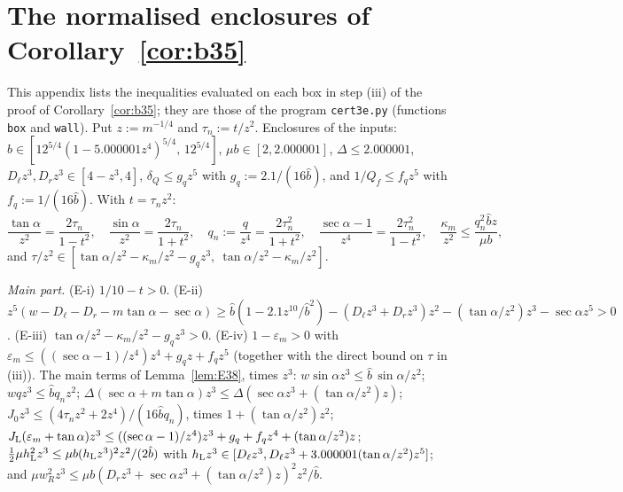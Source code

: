 \documentclass[11pt]{amsart}
\newcommand{\sa}{\sin\alpha}
\newcommand{\ta}{\tan\alpha}
\newcommand{\se}{\sec\alpha}
\theoremstyle{definition}
\theoremstyle{remark}
\numberwithin{equation}{section}
\begin{document}
\section{The normalised enclosures of Corollary~\ref{cor:b35}}\label{app:enc}
This appendix lists the inequalities evaluated on each box in step (iii) of the proof of Corollary~\ref{cor:b35}; they
are those of the program \texttt{cert3e.py} (functions \texttt{box} and \texttt{wall}). Put $z:=m^{-1/4}$ and
$\tau_n:=t/z^2$. Enclosures of the inputs: $\hat b\in[12^{5/4}(1-5.000001z^4)^{5/4},\,12^{5/4}]$, $\mu b\in[2,2.000001]$,
$\Delta\le2.000001$, $D_\ell z^3,D_rz^3\in[4-z^3,4]$, $\delta_Q\le g_qz^5$ with $g_q:=2.1/(16\hat b)$, and
$1/Q_f\le f_qz^5$ with $f_q:=1/(16\hat b)$. With $t=\tau_nz^2$:
\[
\frac{\ta}{z^2}=\frac{2\tau_n}{1-t^2},\quad \frac{\sa}{z^2}=\frac{2\tau_n}{1+t^2},\quad q_n:=\frac q{z^4}=\frac{2\tau_n^2}{1+t^2},
\quad \frac{\se-1}{z^4}=\frac{2\tau_n^2}{1-t^2},\quad \frac{\kappa_m}{z^2}\le\frac{q_n^2\hat bz}{\mu b},
\]
and $\tau/z^2\in[\ta/z^2-\kappa_m/z^2-g_qz^3,\ \ta/z^2-\kappa_m/z^2]$.

\emph{Main part.} (E-i) $1/10-t>0$. (E-ii)
$z^5(w-D_\ell-D_r-m\ta-\se)\ge\hat b(1-2.1z^{10}/\hat b^2)-(D_\ell z^3+D_rz^3)z^2-(\ta/z^2)z^3-\se z^5>0$. (E-iii)
$\ta/z^2-\kappa_m/z^2-g_qz^3>0$. (E-iv) $1-\varepsilon_m>0$ with $\varepsilon_m\le((\se-1)/z^4)z^4+g_qz+f_qz^5$
(together with the direct bound on $\tau$ in (iii)). The main terms of Lemma~\ref{lem:E38}, times $z^3$:
$w\sa z^3\le\hat b\,\sa/z^2$; $wqz^3\le\hat bq_nz^2$; $\Delta(\se+m\ta)z^3\le\Delta(\se z^3+(\ta/z^2)z)$;
$J_0z^3\le(4\tau_nz^2+2z^4)/(16\hat bq_n)$, times $1+(\ta/z^2)z^2$; $J_{\rm L}(\varepsilon_m+\ta)z^3\le
((\se-1)/z^4)z^3+g_q+f_qz^4+(\ta/z^2)z$; $\frac12\mu h_{\rm L}^2z^3\le\mu b(h_{\rm L}z^3)^2z^2/(2\hat b)$ with
$h_{\rm L}z^3\in[D_\ell z^3,D_\ell z^3+3.000001(\ta/z^2)z^5]$; and $\mu w_R^2z^3\le\mu b(D_rz^3+\se z^3+(\ta/z^2)z)^2z^2/\hat b$.
\end{document}

